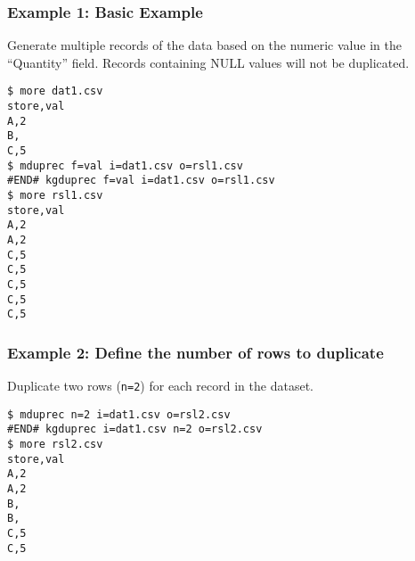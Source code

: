 \subsubsection*{Example 1: Basic Example}

Generate multiple records of the data based on the numeric value in the “Quantity” field. Records containing NULL values will not be duplicated.


\begin{Verbatim}[baselinestretch=0.7,frame=single]
$ more dat1.csv
store,val
A,2
B,
C,5
$ mduprec f=val i=dat1.csv o=rsl1.csv
#END# kgduprec f=val i=dat1.csv o=rsl1.csv
$ more rsl1.csv
store,val
A,2
A,2
C,5
C,5
C,5
C,5
C,5
\end{Verbatim}
\subsubsection*{Example 2: Define the number of rows to duplicate}

Duplicate two rows (\verb|n=2|) for each record in the dataset.


\begin{Verbatim}[baselinestretch=0.7,frame=single]
$ mduprec n=2 i=dat1.csv o=rsl2.csv
#END# kgduprec i=dat1.csv n=2 o=rsl2.csv
$ more rsl2.csv
store,val
A,2
A,2
B,
B,
C,5
C,5
\end{Verbatim}
